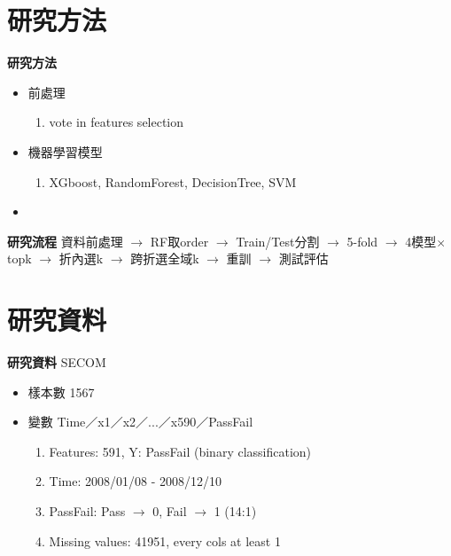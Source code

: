 \documentclass[12pt,aspectratio=43]{beamer}
\begin{document}
\section{研究方法}
\begin{frame}[<+>]{\textbf{研究方法}}
\linespread{1.5}
  \begin{itemize}[]
    \item 前處理
      \begin{enumerate}[]
        \item vote in features selection
      \end{enumerate}
    \item 機器學習模型
      \begin{enumerate}[]
        \item XGboost, RandomForest, DecisionTree, SVM
      \end{enumerate}
    \item 
  \end{itemize}
\end{frame}

\begin{frame}{\textbf{研究流程}}
\centering
\small
資料前處理 $\rightarrow$ RF取order $\rightarrow$ Train/Test分割 $\rightarrow$ 5-fold $\rightarrow$ 4模型$\times$top\text{-}k $\rightarrow$ 折內選k $\rightarrow$ 跨折選全域k $\rightarrow$ 重訓 $\rightarrow$ 測試評估
\end{frame}

\section{研究資料}

\begin{frame}[<+>]{\textbf{研究資料}}
\linespread{1.5}
SECOM
  \smallskip 
  \begin{itemize}[] %
    \item 樣本數 1567
    \item 變數 Time／x1／x2／...／x590／PassFail
      \begin{enumerate}[] %
        \item Features: 591, Y: PassFail (binary classification)
        \item Time: 2008/01/08 - 2008/12/10
        \item PassFail: Pass $\to$ 0, Fail $\to$ 1 (14:1)
        \item Missing values: 41951, every cols at least 1 
      \end{enumerate}
  \end{itemize}
\end{frame}
\end{document}
